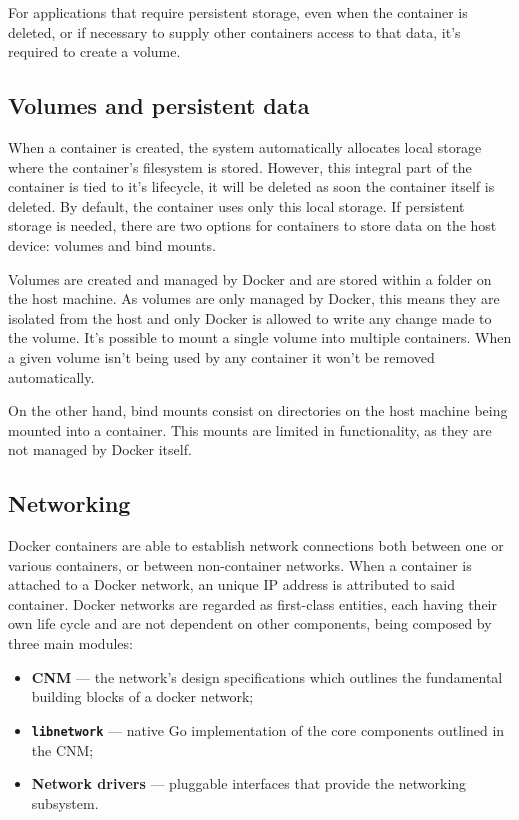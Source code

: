For applications that require persistent storage, even when the container is deleted, or if necessary to supply other containers access to that data, it's required to create a volume.



\subsection{Volumes and persistent data}
\label{sec::arch:volumes}

When a container is created, the system automatically allocates local storage where the container's filesystem is stored. However, this integral part of the container is tied to it's lifecycle, it will be deleted as soon the container itself is deleted. By default, the container uses only this local storage. If persistent storage is needed, there are two options for containers to store data on the host device: volumes and bind mounts\cite{container-storage}.

Volumes are created and managed by Docker and are stored within a folder on the host machine. As volumes are only managed by Docker, this means they are isolated from the host and only Docker is allowed to write any change made to the volume. It's possible to mount a single volume into multiple containers. When a given volume isn't being used by any container it won't be removed automatically.

On the other hand, bind mounts consist on directories on the host machine being mounted into a container. This mounts are limited in functionality, as they are not managed by Docker itself.



\subsection{Networking}
\label{ssec::arch:net}

Docker containers are able to establish network connections both between one or various containers, or between non-container networks. When a container is attached to a Docker network, an unique \acs{IP} address is attributed to said container. Docker networks are regarded as first-class entities, each having their own life cycle and are not dependent on other components, being composed by three main modules\cite{Poulton2020-ju}:

\begin{itemize}
    \item \textbf{\ac{CNM}} --- the network's design specifications which outlines the fundamental building blocks of a docker network;
    \item \textbf{\texttt{libnetwork}} --- native Go implementation of the core components outlined in the \ac{CNM};
    \item \textbf{Network drivers} --- pluggable interfaces that provide the networking subsystem.
\end{itemize}

